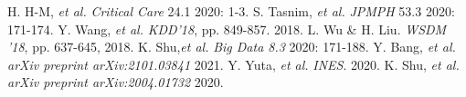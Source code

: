 
{\footnotesize 
\begin{twobibliography}{99}
    \setlength{\parskip}{0cm}
    \setlength{\itemsep}{0cm}
     H. H-M, \textit{et al.} \textit{Critical Care} 24.1 2020: 1-3.
     S. Tasnim, \textit{et al.} \textit{JPMPH} 53.3 2020: 171-174.
     Y. Wang, \textit{et al.} \textit{KDD'18}, pp. 849-857. 2018.
     L. Wu \& H. Liu. \textit{WSDM '18},  pp. 637-645, 2018.
     K. Shu,\textit{et al.} \textit{Big Data 8.3} 2020: 171-188.
     Y. Bang, \textit{et al.} \textit{arXiv preprint arXiv:2101.03841} 2021.
     Y. Yuta, \textit{et al.} \textit{INES}. 2020.
     K. Shu, \textit{et al.}  \textit{arXiv preprint arXiv:2004.01732} 2020.
\end{twobibliography}
}


